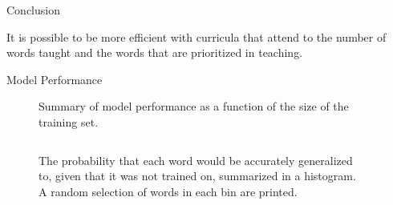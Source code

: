 \documentclass[final]{beamer}
\newlength{\twocolwid}
\begin{document}
\begin{frame}[t]
\begin{columns}[t]
\begin{column}{\twocolwid} %

\begin{alertblock}{Conclusion}
  \begin{center}
    \item It is possible to be more efficient with curricula that attend to the number of words taught and the words that are prioritized in teaching.
  \vspace{0.75em}
  \end{center}
\end{alertblock}

\begin{block}{Model Performance}

\begin{figure}[h]
  \centering
  \def\svgwidth{1.0\linewidth}
  
  \caption{Summary of model performance as a function of the size of the training set.}
  \label{fig:generalization}
\end{figure}

\begin{columns}[t]
  \begin{column}{0.58\linewidth}
    \begin{figure}[h]
      \centering
      \def\svgwidth{0.9\linewidth}
      
      \caption{ The probability that each word would be accurately generalized to, given that it was not trained on, summarized in a histogram. A random selection of words in each bin are printed.}
      \label{fig:word_acc}
    \end{figure}

  \end{column}

  \begin{column}{0.04\linewidth}
  \end{column}


\end{columns}
\end{block}
\end{column}
\end{columns}
\end{frame}
\end{document}
